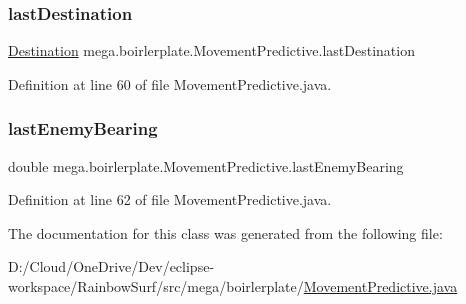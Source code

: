 \subsubsection{\texorpdfstring{last\+Destination}{lastDestination}}
{\footnotesize\ttfamily \hyperlink{classmega_1_1boirlerplate_1_1_movement_predictive_1_1_destination}{Destination} mega.\+boirlerplate.\+Movement\+Predictive.\+last\+Destination\hspace{0.3cm}{\ttfamily [private]}}



Definition at line 60 of file Movement\+Predictive.\+java.

\mbox{\label{classmega_1_1boirlerplate_1_1_movement_predictive_ae2b44f98d4bf2f87abd4a8c136792aa4}} 
\subsubsection{\texorpdfstring{last\+Enemy\+Bearing}{lastEnemyBearing}}
{\footnotesize\ttfamily double mega.\+boirlerplate.\+Movement\+Predictive.\+last\+Enemy\+Bearing\hspace{0.3cm}{\ttfamily [private]}}



Definition at line 62 of file Movement\+Predictive.\+java.



The documentation for this class was generated from the following file\+:\begin{DoxyCompactItemize}
\item 
D\+:/\+Cloud/\+One\+Drive/\+Dev/eclipse-\/workspace/\+Rainbow\+Surf/src/mega/boirlerplate/\hyperlink{_movement_predictive_8java}{Movement\+Predictive.\+java}\end{DoxyCompactItemize}
